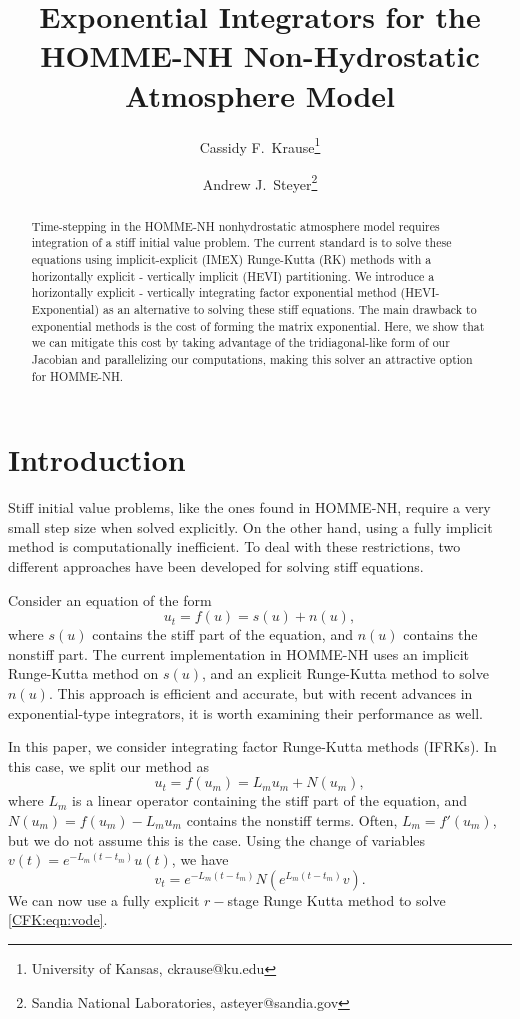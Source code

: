 \documentclass{csri19}
\title{Exponential Integrators for the HOMME-NH Non-Hydrostatic Atmosphere
 Model}
\author{Cassidy F.\ Krause\thanks{University of Kansas, ckrause@ku.edu}
\and Andrew J.\ Steyer\thanks{Sandia National Laboratories, asteyer@sandia.gov}}
\begin{document}
\maketitle

\begin{abstract}
Time-stepping in the HOMME-NH nonhydrostatic atmosphere model requires 
integration of a stiff initial value problem. The current standard is to
 solve these equations using implicit-explicit (IMEX) Runge-Kutta (RK) 
methods with a horizontally explicit - vertically implicit (HEVI) 
partitioning. We introduce a horizontally explicit - vertically integrating
 factor exponential method (HEVI-Exponential) as an alternative to solving 
these stiff equations. The main drawback to exponential methods is the cost
 of forming the matrix exponential. Here, we show that we can mitigate this 
cost by taking advantage of the tridiagonal-like form of our Jacobian and 
parallelizing our computations, making this solver an attractive option for
HOMME-NH.
\end{abstract}

\section{Introduction} \label{CFK:sec:intro}
Stiff initial value problems, like the ones found in HOMME-NH, require a 
very small step size when solved explicitly. On the other hand, using a 
fully implicit method is computationally inefficient. To deal with these 
restrictions, two different approaches have been developed for solving 
stiff equations.

Consider an equation of the form \[ u_t = f(u) = s(u) + n(u),\] where $s(u)$ 
contains the stiff part of the equation, and $n(u)$ contains the nonstiff 
part. The current implementation in HOMME-NH uses an implicit Runge-Kutta
method on $s(u)$, and an explicit Runge-Kutta method to solve $n(u)$. This 
approach is efficient and accurate, but with recent advances in 
exponential-type integrators, it is worth examining their performance as 
well.

In this paper, we consider integrating factor Runge-Kutta methods (IFRKs). 
In this case, we split our method as \[ u_t = f(u_m) = L_mu_m + N(u_m),\] 
where $L_m$ is a linear operator containing the stiff part of the equation, 
and $N(u_m) = f(u_m)-L_mu_m$ contains the nonstiff terms. Often, 
$L_m = f'(u_m)$, but we do not assume this is the case. Using the change of
 variables $v(t) = e^{-L_m(t-t_m)}u(t)$, we have
\begin{equation}\label{CFK:eqn:vode}
v_t = e^{-L_m(t-t_m)}N(e^{L_m(t-t_m)}v).
\end{equation} 
We can now use a fully explicit $r-$stage Runge Kutta method to solve 
\ref{CFK:eqn:vode}.
\end{document}
